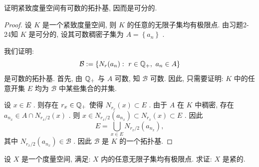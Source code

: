\documentclass{article}
\begin{document}
\begin{problem}[2-25]
    证明紧致度量空间有可数的拓扑基, 因而是可分的.
\end{problem}

\begin{proof}
    设 \( K \) 是一个紧致度量空间, 则 \( K \) 的任意的无限子集均有极限点. 由习题2-24知 \( K \) 是可分的, 设其可数稠密子集为 \( A=\left\{a_n\right\} \) . \par
    我们证明:
    \[ \mathcal{B}:=\left\{N_r(a_n):\ r\in\Q_+,\ a_n\in A\right\} \] 
    是可数的拓扑基. 首先, 由 \( \mathbb{Q}_+ \) 与 \( A \) 可数, 知 \( \mathcal{B} \) 可数. 因此, 只需要证明:  \( K \) 中的任意开集 \( E \) 均为 \( \mathcal{B} \) 中某些集合的并集.\par
    设 \( x\in E \) . 则存在 \( r_x\in\mathbb{Q}_+ \) 使得 \( N_{r_x}(x)\subset E \) . 由于 \( A \) 在 \( K \) 中稠密, 存在 \( a_{n_x}\in A\cap N_{r_x/2}(x) \) . 则 \( x\in N_{r_x/2}(a_{n_x})\subset N_{r_x}(x)\subset E \) . 因此
    \[ E=\bigcup_{x\in E}N_{r_x/2}(a_{n_x}), \]
    其中 \( N_{r_x/2}(a_{n_x})\in\mathcal{B} \) . 因此 \( \mathcal{B} \) 是 \( K \) 的一个拓扑基.
\end{proof}

\begin{problem}[2-26]
    设 \( X \) 是一个度量空间, 满足: \( X \) 内的任意无限子集均有极限点. 求证: \( X \) 是紧的.
\end{problem}
\end{document}
